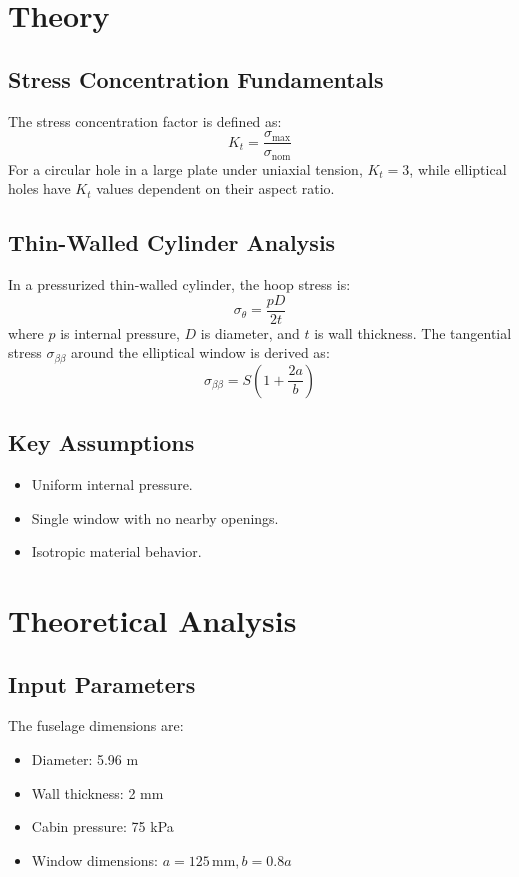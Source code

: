 \documentclass[a4paper,11pt]{article}
\begin{document}
\newpage

\section{Theory}
\subsection{Stress Concentration Fundamentals}
The stress concentration factor is defined as:
\[
K_t = \frac{\sigma_{\text{max}}}{\sigma_{\text{nom}}}
\]
For a circular hole in a large plate under uniaxial tension, \(K_t = 3\), while elliptical holes have \(K_t\) values dependent on their aspect ratio.

\subsection{Thin-Walled Cylinder Analysis}
In a pressurized thin-walled cylinder, the hoop stress is:
\[
\sigma_{\theta} = \frac{pD}{2t}
\]
where \(p\) is internal pressure, \(D\) is diameter, and \(t\) is wall thickness. The tangential stress \(\sigma_{\beta\beta}\) around the elliptical window is derived as:
\[
\sigma_{\beta\beta} = S \left(1 + \frac{2a}{b}\right)
\]

\subsection{Key Assumptions}
\begin{itemize}
    \item Uniform internal pressure.
    \item Single window with no nearby openings.
    \item Isotropic material behavior.
\end{itemize}

\newpage

\section{Theoretical Analysis}
\subsection{Input Parameters}
The fuselage dimensions are:
\begin{itemize}
    \item Diameter: 5.96 m
    \item Wall thickness: 2 mm
    \item Cabin pressure: 75 kPa
    \item Window dimensions: \(a = 125 \, \text{mm}, b = 0.8a\)
\end{itemize}
\end{document}
